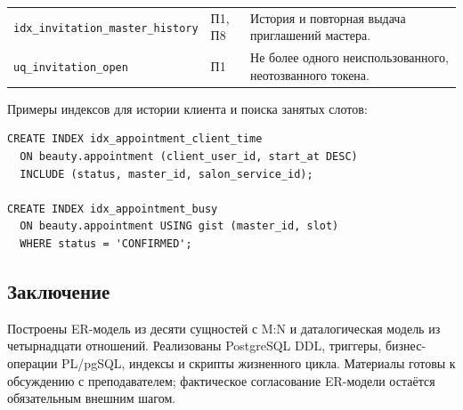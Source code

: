 \documentclass[11pt,a4paper]{article}
\begin{document}
\begin{longtable}{L{6.4cm}L{2.0cm}L{7.3cm}}
\texttt{idx\_\allowbreak{}invitation\_\allowbreak{}master\_\allowbreak{}history} & П1, П8 & История и повторная выдача приглашений мастера.\\
\texttt{uq\_\allowbreak{}invitation\_\allowbreak{}open} & П1 & Не более одного неиспользованного, неотозванного токена.\\
\bottomrule\end{longtable}

Примеры индексов для истории клиента и поиска занятых слотов:

\begin{lstlisting}[style=sql]
CREATE INDEX idx_appointment_client_time
  ON beauty.appointment (client_user_id, start_at DESC)
  INCLUDE (status, master_id, salon_service_id);

CREATE INDEX idx_appointment_busy
  ON beauty.appointment USING gist (master_id, slot)
  WHERE status = 'CONFIRMED';
\end{lstlisting}


\par\begin{samepage}\section{Заключение}
Построены ER-модель из десяти сущностей с M:N и даталогическая модель из четырнадцати отношений. Реализованы PostgreSQL DDL, триггеры, бизнес-операции PL/pgSQL, индексы и скрипты жизненного цикла. Материалы готовы к обсуждению с преподавателем; фактическое согласование ER-модели остаётся обязательным внешним шагом.
\par\end{samepage}
\end{document}
